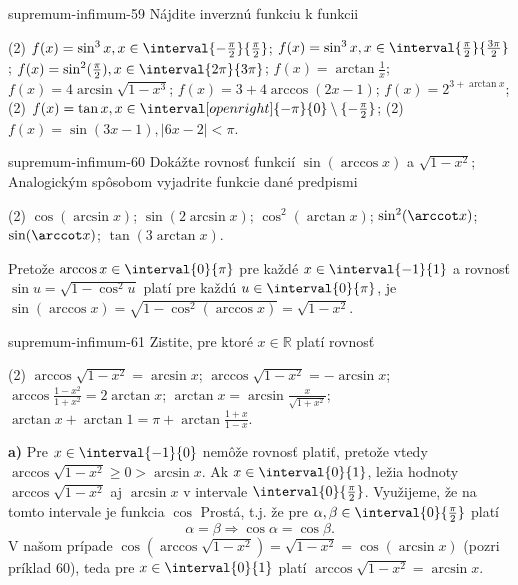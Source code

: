 \begin{defproblem}{supremum-infimum-59}
Nájdite inverznú funkciu k funkcii
\begin{tasks}(2)
  \task $f(x)=\sin^3 x, x \in \interval{-\frac{\pi}{2}}{\frac{\pi}{2}}$;
  \task $f(x)=\sin^3 x, x \in \interval{\frac{\pi}{2}}{\frac{3\pi}{2}}$;
  \task $f(x)=\sin^2 (\frac{\pi}{2}),x \in \interval{2\pi}{3\pi}$;
  \task $f(x)=\arctan\frac{1}{x}$;
  \task $f(x)=4\arcsin\sqrt{1-x^3}$;
  \task $f(x)=3+4\arccos(2x-1)$;
  \task $f(x)=2^{3+\arctan x}$;
  \startnewitemline
  \task*(2) $f(x)=\tan{x},
    x \in \interval[open right]{-\pi}{0} \setminus \{-\frac{\pi}{2}\}
  $;
  \task*(2) $f(x)=\sin{(3x-1)}, |6x-2| < \pi$.
\end{tasks}
\end{defproblem}

\begin{defproblem}{supremum-infimum-60}
Dokážte rovnosť funkcií $\sin(\arccos x)$ a $\sqrt{1-x^2}$; Analogickým spôsobom
vyjadrite funkcie dané predpismi
\begin{tasks}(2)
  \task $\cos(\arcsin x)$;
  \task $\sin(2\arcsin x)$;
  \task $\cos^2 (\arctan x)$;
  \task $\sin^2 (\arccot x)$;
  \task $\sin (\arccot x)$;
  \task $\tan (3\arctan x)$.
\end{tasks}

\begin{solution}
  Pretože $\arccos x \in \interval{0}{\pi}$ pre každé $x \in \interval{-1}{1}$ a
  rovnosť $\sin u=\sqrt{1-\cos^2 u}$ platí pre každú $u \in \interval{0}{\pi}$,
  je $\sin(\arccos x) = \sqrt{1-\cos^2(\arccos x)} = \sqrt{1-x^2}$.
\end{solution}
\end{defproblem}

\begin{defproblem}{supremum-infimum-61}
Zistite, pre ktoré $x\in\mathbb{R}$ platí rovnosť
\begin{tasks}(2)
  \task $\arccos\sqrt{1-x^2}=\arcsin x$;
  \task $\arccos\sqrt{1-x^2}=-\arcsin x$;
  \task $\arccos\frac{1-x^2}{1+x^2}=2\arctan x$;
  \task $\arctan x=\arcsin\frac{x}{\sqrt{1+x^2}}$;
  \task $\arctan x +\arctan 1 =\pi+ \arctan\frac{1+x}{1-x}$.
\end{tasks}

\begin{solution}
  \textbf{a)} Pre $x \in \interval{-1}{0}$ nemôže rovnosť platiť, pretože vtedy
  $\arccos\sqrt{1-x^2} \geq 0 > \arcsin{x}$. Ak $x \in \interval{0}{1}$, ležia
  hodnoty $\arccos{\sqrt{1-x^2}}$ aj $\arcsin{x}$ v intervale
  $\interval{0}{\frac{\pi}{2}}$. Využijeme, že na tomto intervale je funkcia
  $\cos$ Prostá, t.j. že pre $\alpha,\beta \in \interval{0}{\frac{\pi}{2}}$
  platí
  \[\alpha = \beta \Rightarrow \cos{\alpha} = \cos{\beta}.\]
  V našom prípade $\cos(\arccos\sqrt{1-x^2})=\sqrt{1-x^2}=\cos(\arcsin x)$
  (pozri príklad $60$), teda pre $x \in \interval{0}{1}$ platí
  $\arccos{\sqrt{1-x^2}}=\arcsin x$.
\end{solution}
\end{defproblem}

